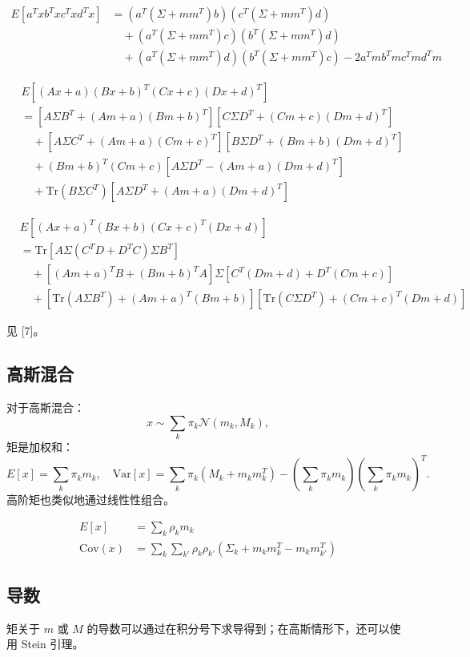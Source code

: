 \begin{align*}
E[a^Txb^Txc^Txd^Tx] &= (a^T(\Sigma + mm^T)b)(c^T(\Sigma + mm^T)d) \\
&\quad +(a^T(\Sigma + mm^T)c)(b^T(\Sigma + mm^T)d) \\
&\quad +(a^T(\Sigma + mm^T)d)(b^T(\Sigma + mm^T)c) - 2a^Tmb^Tmc^Tmd^Tm
\end{align*}

\begin{align*}
&E[(Ax + a)(Bx + b)^T(Cx + c)(Dx + d)^T] \\
&= [A\Sigma B^T + (Am + a)(Bm + b)^T][C\Sigma D^T + (Cm + c)(Dm + d)^T] \\
&\quad +[A\Sigma C^T + (Am + a)(Cm + c)^T][B\Sigma D^T + (Bm + b)(Dm + d)^T] \\
&\quad +(Bm + b)^T(Cm + c)[A\Sigma D^T - (Am + a)(Dm + d)^T] \\
&\quad +\text{Tr}(B\Sigma C^T)[A\Sigma D^T + (Am + a)(Dm + d)^T]
\end{align*}

\begin{align*}
&E[(Ax + a)^T(Bx + b)(Cx + c)^T(Dx + d)] \\
&= \text{Tr}[A\Sigma(C^TD + D^TC)\Sigma B^T] \\
&\quad +[(Am + a)^TB + (Bm + b)^TA]\Sigma[C^T(Dm + d) + D^T(Cm + c)] \\
&\quad +[\text{Tr}(A\Sigma B^T) + (Am + a)^T(Bm + b)][\text{Tr}(C\Sigma D^T) + (Cm + c)^T(Dm + d)]
\end{align*}

见 [7]。


\subsection{高斯混合}
对于高斯混合：
\[
   x \sim \sum_k \pi_k \mathcal{N}(m_k, M_k),
\]
矩是加权和：
\[
   E[x] = \sum_k \pi_k m_k, \quad
   \mathrm{Var}[x] = \sum_k \pi_k (M_k + m_k m_k^T) - \left(\sum_k \pi_k m_k\right)\left(\sum_k \pi_k m_k\right)^T.
\]
高阶矩也类似地通过线性性组合。


\begin{align*}
E[x] &= \sum_k \rho_k m_k \tag{384} \\[1em]
\text{Cov}(x) &= \sum_k\sum_{k'} \rho_k\rho_{k'} (\Sigma_k + m_km_k^T - m_km_{k'}^T) \tag{385}
\end{align*}

\subsection{导数}
矩关于 $m$ 或 $M$ 的导数可以通过在积分号下求导得到；在高斯情形下，还可以使用 Stein 引理。

